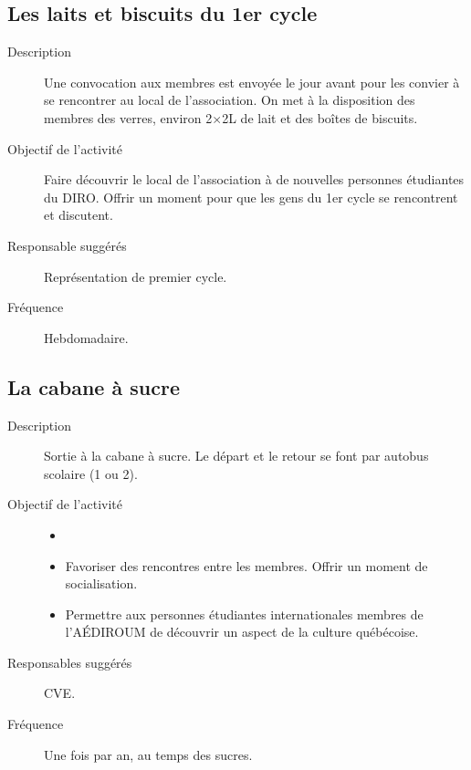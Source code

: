 \documentclass{aediroum}
\begin{document}
\subsection{Les laits et biscuits du 1er cycle}
\begin{description}
	\item[Description] Une convocation aux membres est envoyée le jour avant pour les convier à se rencontrer au local de l'association. On met à la disposition des membres des verres, environ 2$\times$2L de lait et des boîtes de biscuits.
	\item[Objectif de l'activité] Faire découvrir le local de l'association à de nouvelles personnes étudiantes du DIRO. Offrir un moment pour que les gens du 1er cycle se rencontrent et discutent.
	\item[Responsable suggérés] Représentation de premier cycle.
	\item[Fréquence] Hebdomadaire.
\end{description}

\subsection{La cabane à sucre}
\begin{description}
	\item[Description] Sortie à la cabane à sucre. Le départ et le retour se font par autobus scolaire (1 ou 2).
	\item[Objectif de l'activité]
	\begin{itemize}
		\item[]
		\item Favoriser des rencontres entre les membres. Offrir un moment de socialisation.
		\item Permettre aux personnes étudiantes internationales membres de l'AÉDIROUM de découvrir un aspect de la culture québécoise.
	\end{itemize}
	\item[Responsables suggérés] CVE.
	\item[Fréquence] Une fois par an, au temps des sucres.
\end{description}
\end{document}

